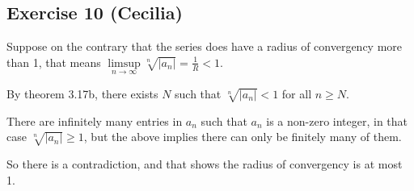 \subsection*{Exercise 10 (Cecilia)}

Suppose on the contrary that the series does have a radius of convergency more than 1, that means $ \limsup\limits_{n \to \infty} \sqrt[n]{|a_n|} = \frac{1}{R} < 1 $.

By theorem 3.17b, there exists $ N $ such that $ \sqrt[n]{|a_n|} < 1 $ for all $ n \ge N $.

There are infinitely many entries in $ a_n $ such that $ a_n $ is a non-zero integer, in that case $ \sqrt[n]{|a_n|} \ge 1 $, but the above implies there can only be finitely many of them.

So there is a contradiction, and that shows the radius of convergency is at most 1.